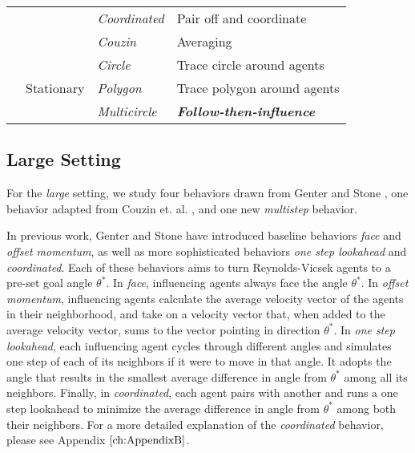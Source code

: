 \begin{table}[]
\begin{tabular}{|l|l|l|l|}
                       &                             & \textit{Coordinated}      & Pair off and coordinate      \\ \cline{3-4}
                       &                             & \textit{Couzin}      & Averaging       \\ \cline{2-4}
                       & \multirow{3}{*}{Stationary} & \textit{Circle}      & Trace circle around agents              \\ \cline{3-4}
                       &                             & \textit{Polygon}     & Trace polygon around agents             \\ \cline{3-4}
                       &                             & \textit{Multicircle} & \textit{\textbf{Follow-then-influence}} \\ \hline
\end{tabular}
\end{table}

\subsection{Large Setting}

For the \textit{large} setting, we study four behaviors drawn from Genter and
Stone \cite{genter201612steplookahead,genter2016facegoalfacecurrent,
genter2015placement}, one behavior adapted from Couzin et. al.
\cite{couzin2005}, and one new \textit{multistep} behavior.

In previous work, Genter and Stone have introduced baseline behaviors
\textit{face} and \textit{offset momentum}, as well as more sophisticated
behaviors \textit{one step lookahead} and \textit{coordinated}.
Each of these behaviors aims to turn Reynolds-Vicsek agents to a pre-set goal
angle $\theta^*$.
In \textit{face}, influencing agents always face the angle $\theta^*$.
In \textit{offset momentum}, influencing agents calculate the average velocity
vector of the agents in their neighborhood, and take on a velocity vector that,
when added to the average velocity vector, sums to the vector pointing in
direction $\theta^*$.
In \textit{one step lookahead}, each influencing agent cycles through different
angles and simulates one step of each of its neighbors if it were to move in
that angle.
It adopts the angle that results in the smallest average difference in angle
from $\theta^*$ among all its neighbors.
Finally, in \textit{coordinated}, each agent pairs with another and runs a one
step lookahead to minimize the average difference in angle from $\theta^*$
among both their neighbors.
For a more detailed explanation of the \textit{coordinated} behavior, please
see Appendix $\ref{ch:AppendixB}$.

